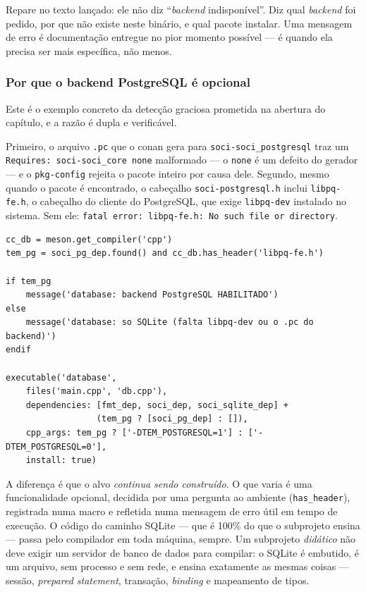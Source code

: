\begin{regra}
Repare no texto lançado: ele não diz ``\emph{backend} indisponível''. Diz qual
\emph{backend} foi pedido, por que não existe neste binário, e qual pacote
instalar. Uma mensagem de erro é documentação entregue no pior momento
possível --- é quando ela precisa ser mais específica, não menos.
\end{regra}

\subsubsection{Por que o backend PostgreSQL é opcional}

Este é o exemplo concreto da detecção graciosa prometida na abertura do
capítulo, e a razão é dupla e verificável.

Primeiro, o arquivo \texttt{.pc} que o \gls{conan} gera para
\texttt{soci-soci\_postgresql} traz um \texttt{Requires: soci-soci\_core none}
malformado --- o \texttt{none} é um defeito do gerador --- e o
\texttt{pkg-config} rejeita o pacote inteiro por causa dele. Segundo, mesmo
quando o pacote é encontrado, o cabeçalho \texttt{soci-postgresql.h} inclui
\texttt{libpq-fe.h}, o cabeçalho do cliente do PostgreSQL, que exige
\texttt{libpq-dev} instalado no sistema. Sem ele:
\texttt{fatal error: libpq-fe.h: No such file or directory}.

\begin{lstlisting}[style=bt, language=Meson,
    caption={\texttt{src/database/meson.build}: perguntar ao compilador em vez
             de presumir.}]
cc_db = meson.get_compiler('cpp')
tem_pg = soci_pg_dep.found() and cc_db.has_header('libpq-fe.h')

if tem_pg
    message('database: backend PostgreSQL HABILITADO')
else
    message('database: so SQLite (falta libpq-dev ou o .pc do backend)')
endif

executable('database',
    files('main.cpp', 'db.cpp'),
    dependencies: [fmt_dep, soci_dep, soci_sqlite_dep] +
                  (tem_pg ? [soci_pg_dep] : []),
    cpp_args: tem_pg ? ['-DTEM_POSTGRESQL=1'] : ['-DTEM_POSTGRESQL=0'],
    install: true)
\end{lstlisting}

\begin{porque}
A diferença é que o alvo \emph{continua sendo construído}. O que varia é uma
funcionalidade opcional, decidida por uma pergunta ao ambiente
(\texttt{has\_header}), registrada numa macro e refletida numa mensagem de
erro útil em tempo de execução. O código do caminho SQLite --- que é 100\% do
que o subprojeto ensina --- passa pelo compilador em toda máquina, sempre. Um
subprojeto \emph{didático} não deve exigir um servidor de banco de dados para
compilar: o SQLite é embutido, é um arquivo, sem processo e sem rede, e ensina
exatamente as mesmas coisas --- sessão, \emph{prepared statement}, transação,
\emph{binding} e mapeamento de tipos.
\end{porque}

